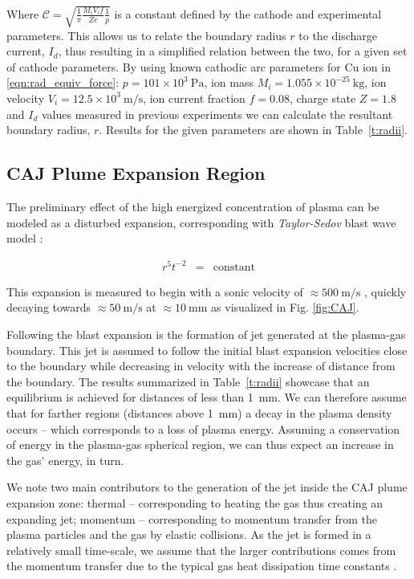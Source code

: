 \documentclass[a4paper]{iacas}%
\begin{document}
Where $\mathcal{C} = \sqrt{\frac{1}{\pi}\frac{M_i V_i f}{Z e}\frac{1}{p}}$ is a constant defined by the cathode and experimental parameters. This allows us to relate the boundary radius $r$ to the discharge current, $I_d$, thus resulting in a simplified relation between the two, for a given set of cathode parameters. By using known cathodic arc parameters for Cu ion in \eqref{eqn:rad_equiv_force}: $p = 101 \times 10^3~\mathrm{Pa}$, ion mass $M_i = 1.055 \times 10^{-25}~\mathrm{kg}$, ion velocity $V_i = 12.5 \times 10^3~\mathrm{m/s}$, ion current fraction $f=0.08$, charge state $Z = 1.8$ and $I_d$ values measured in previous experiments \cite{KR,KRClose} we can calculate the resultant boundary radius, $r$. Results for the given parameters are shown in Table~\ref{t:radii}. 

\subsection{CAJ Plume Expansion Region}\label{subs:CAJ_expansion}

The preliminary effect of the high energized concentration of plasma can be modeled \cite{KR} as a disturbed expansion, corresponding with \emph{Taylor-Sedov} blast wave model \cite{TAYLOR,SEDOV}: 

\begin{eqnarray}\label{eqn:taylor_sedov}
r^5 t^{-2} &=& \mathrm{constant}
\end{eqnarray}

This expansion is measured to begin with a sonic velocity of $\approx 500~\mathrm{m/s}$ \cite{KRClose}, quickly decaying towards $\approx 50~\mathrm{m/s}$ \cite{KR,KRFar} at $\approx 10~\mathrm{mm}$ as visualized in Fig. \ref{fig:CAJ}.

Following the blast expansion is the formation of jet generated at the plasma-gas boundary. This jet is assumed to follow the initial blast expansion velocities close to the boundary while decreasing in velocity with the increase of distance from the boundary. The results summarized in Table~\ref{t:radii} showcase that an equilibrium is achieved for distances of less than 1~mm. We can therefore assume that for farther regions (distances above 1~mm) a decay in the plasma density occurs -- which corresponds to a loss of plasma energy. Assuming a conservation of energy in the plasma-gas spherical region, we can thus expect an increase in the gas' energy, in turn.

We note two main contributors to the generation of the jet inside the CAJ plume expansion zone: thermal -- corresponding to heating the gas thus creating an expanding jet; momentum -- corresponding to momentum transfer from the plasma particles and the gas by elastic collisions. As the jet is formed in a relatively small time-scale, we assume that the larger contributions comes from the momentum transfer due to the typical gas heat dissipation time constants \cite{KRClose}.
\end{document}
